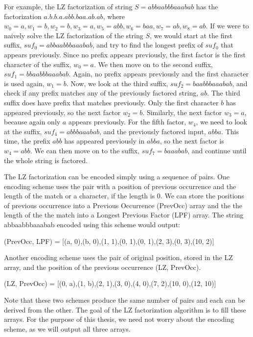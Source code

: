For example, the LZ factorization of string $S=abbaabbbaaabab$ has the factorization $a.b.b.a.abb.baa.ab.ab$, where $w_0 = a, w_1 = b, w_2 = b, w_3 = a, w_5 = abb, w_6 = baa, w_7 = ab, w_8 = ab$. 
If we were to naively solve the LZ factorization of the string $S$, we would start at the first suffix, $suf_0=abbaabbbaaabab$, and try to find the longest prefix of $suf_0$ that appears previously.
Since no prefix appears previously, the first factor is the first character of the suffix, $w_0 = a$.
We then move on to the second suffix, $suf_1 = bbaabbbaaabab$.
Again, no prefix appears previously and the first character is used again, $w_1 = b$.
Now, we look at the third suffix, $suf_2 = baabbbaaabab$, and check if any prefix matches any of the previously factored string, $ab$.
The third suffix does have prefix that matches previously.
Only the first character $b$ has appeared previously, so the next factor $w_2 = b$.
Similarly, the next factor $w_3 = a$, because again only $a$ appears previously.
For the fifth factor, $w_4$, we need to look at the suffix, $suf_4 = abbbaaabab$, and the previously factored input, $abba$.
This time, the prefix $abb$ has appeared previously in $abba$, so the next factor is $w_4 = abb$.
We can then move on to the suffix, $suf_7 = baaabab$, and continue until the whole string is factored.

The LZ factorization can be encoded simply using a sequence of pairs.
One encoding scheme uses the pair with a position of previous occurrence and the length of the match or a character, if the length is 0.
We can store the positions of previous occurrence into a Previous Occurrence (PrevOcc) array and the the length of the the match into a Longest Previous Factor (LPF) array.
The string abbaabbbaaabab encoded using this scheme would output:\\
\centerline{(PrevOcc, LPF) = [(a, 0),(b, 0),(1, 1),(0, 1),(0, 1),(2, 3),(0, 3),(10, 2)]}
Another encoding scheme uses the pair of original position, stored in the LZ array, and the position of the previous occurrence (LZ, PrevOcc).\\
\centerline{(LZ, PrevOcc) = [(0, a),(1, b),(2, 1),(3, 0),(4, 0),(7, 2),(10, 0),(12, 10)]}
Note that these two schemes produce the same number of pairs and each can be derived from the other.
The goal of the LZ factorization algorithm is to fill these arrays.
For the purpose of this thesis, we need not worry about the encoding scheme, as we will output all three arrays.

